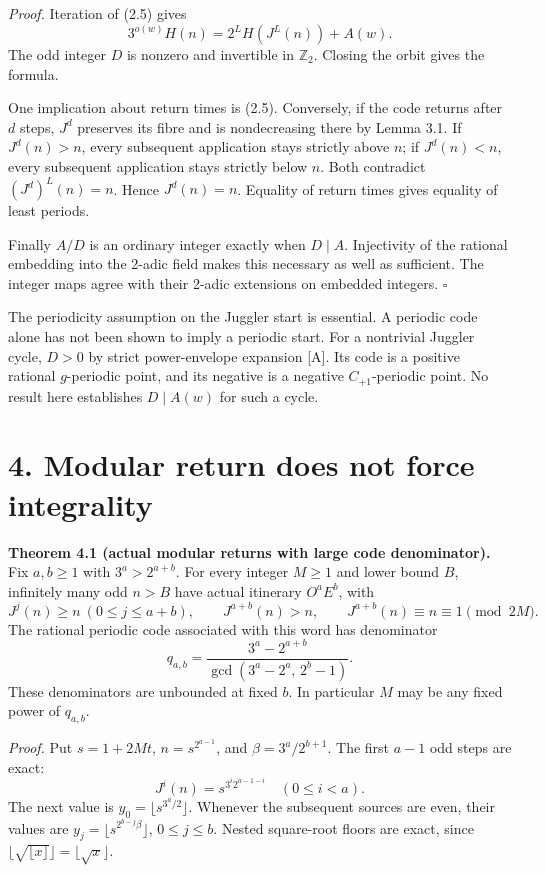 \documentclass[11pt,a4paper]{article}
\begin{document}
\emph{Proof.} Iteration of (2.5) gives \[
3^{o(w)}H(n)=2^LH(J^L(n))+A(w).
\] The odd integer \(D\) is nonzero and invertible in \(\mathbb Z_2\).
Closing the orbit gives the formula.

One implication about return times is (2.5). Conversely, if the code
returns after \(d\) steps, \(J^d\) preserves its fibre and is
nondecreasing there by Lemma 3.1. If \(J^d(n)>n\), every subsequent
application stays strictly above \(n\); if \(J^d(n)<n\), every
subsequent application stays strictly below \(n\). Both contradict
\((J^d)^L(n)=n\). Hence \(J^d(n)=n\). Equality of return times gives
equality of least periods.

Finally \(A/D\) is an ordinary integer exactly when \(D\mid A\).
Injectivity of the rational embedding into the 2-adic field makes this
necessary as well as sufficient. The integer maps agree with their
2-adic extensions on embedded integers. \(\square\)

The periodicity assumption on the Juggler start is essential. A periodic
code alone has not been shown to imply a periodic start. For a
nontrivial Juggler cycle, \(D>0\) by strict power-envelope expansion
{[}A{]}. Its code is a positive rational \(g\)-periodic point, and its
negative is a negative \(C_{+1}\)-periodic point. No result here
establishes \(D\mid A(w)\) for such a cycle.

\section{4. Modular return does not force
integrality}\label{modular-return-does-not-force-integrality}

\textbf{Theorem 4.1 (actual modular returns with large code
denominator).} Fix \(a,b\ge1\) with \(3^a>2^{a+b}\). For every integer
\(M\ge1\) and lower bound \(B\), infinitely many odd \(n>B\) have actual
itinerary \(O^aE^b\), with \[
J^j(n)\ge n\ (0\le j\le a+b),\qquad J^{a+b}(n)>n,\qquad
J^{a+b}(n)\equiv n\equiv1\pmod{2M}.
\tag{4.1}
\] The rational periodic code associated with this word has denominator
\[
q_{a,b}=\frac{3^a-2^{a+b}}{\gcd(3^a-2^a,\,2^b-1)}.
\tag{4.2}
\] These denominators are unbounded at fixed \(b\). In particular \(M\)
may be any fixed power of \(q_{a,b}\).

\emph{Proof.} Put \(s=1+2Mt\), \(n=s^{2^{a-1}}\), and
\(\beta=3^a/2^{b+1}\). The first \(a-1\) odd steps are exact: \[
J^i(n)=s^{3^i2^{a-1-i}}\quad(0\le i<a).
\] The next value is \(y_0=\lfloor s^{3^a/2}\rfloor\). Whenever the
subsequent sources are even, their values are
\(y_j=\lfloor s^{2^{b-j}\beta}\rfloor\), \(0\le j\le b\). Nested
square-root floors are exact, since
\(\lfloor\sqrt{\lfloor x\rfloor}\rfloor=\lfloor\sqrt x\rfloor\).
\end{document}
